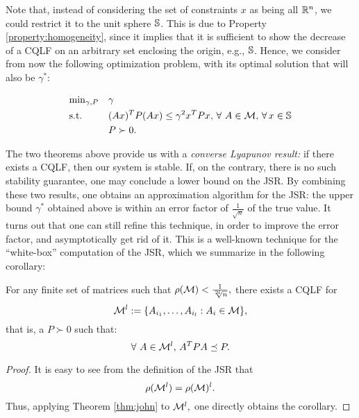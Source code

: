 
Note that, instead of considering the set of constraints $x$ as being all $\mathbb{R}^n$, we could restrict it to the unit sphere $\mathbb{S}$. This is due to Property \ref{property:homogeneity}, since it implies that it is sufficient to show the decrease of a CQLF on an arbitrary set enclosing the origin, e.g., $\mathbb{S}$. Hence, we consider from now the following optimization problem, with its optimal solution that will also be $\gamma^{*}$:

\begin{equation}\label{eqn:campiOpt1}
\begin{aligned}
& \text{min}_{\gamma, P} & & \gamma \\
& \text{s.t.} 
&  & (Ax)^TP(Ax) \leq \gamma^2 x^TPx,\,\forall\ A \in \mathcal{M}, \,\forall\, x \in \mathbb{S}\\
& && P \succ 0. \\
\end{aligned}
\end{equation}



The two theorems above provide us with a \emph{converse Lyapunov result:} if there exists a CQLF, then our system is stable. If, on the contrary, there is no such stability guarantee, one may conclude a lower bound on the JSR. By combining these two results, one obtains an approximation algorithm for the JSR: the upper bound $\gamma^*$ obtained above is within an error factor of $\frac{1}{\sqrt{n}}$ of the true value. It turns out that one can still refine this technique, in order to improve the error factor, and asymptotically get rid of it. This is a well-known technique for the ``white-box'' computation of the JSR, which we summarize in the following corollary:

\begin{corollary}\label{cor:approx-products}
For any finite set of matrices such that $\rho(\mathcal{M})<\frac{1}{\sqrt[2l]{n}},$ there exists a CQLF for $$\mathcal{M}^l:=\{A_{i_1},\dots, A_{i_{l}}:A_i\in\mathcal{M}\},$$ that is, a $P\succ 0$ such that: $$\forall\ A\in \mathcal{M}^l,\, A^TPA\preceq P. $$
\end{corollary}

\begin{proof}
It is easy to see from the definition of the JSR that $$\rho(\mathcal{M}^l)=\rho(\mathcal{M})^l.$$ Thus, applying Theorem \ref{thm:john} to $\mathcal{M}^l,$ one directly obtains the corollary.
\end{proof}


